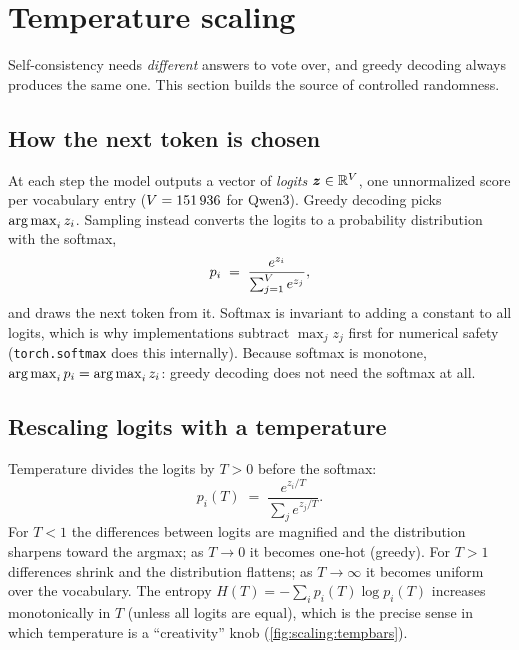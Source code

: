 \section{Temperature scaling}\label{sec:scaling:temp}


Self-consistency needs \emph{different} answers to vote over, and greedy decoding always produces
the same one. This section builds the source of controlled randomness.

\subsection{How the next token is chosen}\label{sec:scaling:select}

At each step the model outputs a vector of \emph{logits} $\bm{z} \in \mathbb{R}^{V}$, one unnormalized
score per vocabulary entry ($V = \num{151936}$ for Qwen3). Greedy decoding picks
$\operatorname*{arg\,max}_i z_i$. Sampling instead converts the logits to a probability distribution with the
softmax,
\begin{equation}
  p_i \;=\; \frac{e^{z_i}}{\sum_{j=1}^{V} e^{z_j}},
\end{equation}
and draws the next token from it. Softmax is invariant to adding a constant to all logits, which is
why implementations subtract $\max_j z_j$ first for numerical safety (\texttt{torch.softmax} does
this internally). Because softmax is monotone, $\operatorname*{arg\,max}_i p_i = \operatorname*{arg\,max}_i z_i$: greedy decoding
does not need the softmax at all.

\subsection{Rescaling logits with a temperature}\label{sec:scaling:rescale}

Temperature divides the logits by $T > 0$ before the softmax:
\begin{equation}
  p_i(T) \;=\; \frac{e^{z_i/T}}{\sum_j e^{z_j/T}}.
  \label{eq:scaling:temp}
\end{equation}
For $T < 1$ the differences between logits are magnified and the distribution sharpens toward the
argmax; as $T \to 0$ it becomes one-hot (greedy). For $T > 1$ differences shrink and the
distribution flattens; as $T \to \infty$ it becomes uniform over the vocabulary. The entropy
$H(T) = -\sum_i p_i(T) \log p_i(T)$ increases monotonically in $T$ (unless all logits are equal),
which is the precise sense in which temperature is a ``creativity'' knob
(\cref{fig:scaling:tempbars}).

